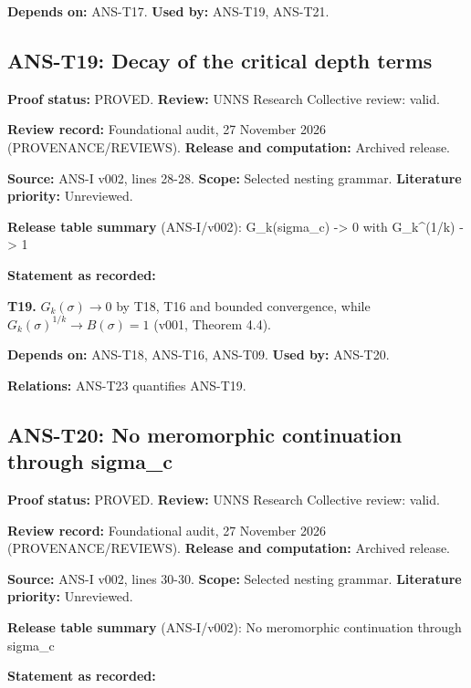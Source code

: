 \documentclass[
  11pt,
]{article}
\begin{document}
\textbf{Depends on:} ANS-T17. \textbf{Used by:} ANS-T19, ANS-T21.

\hypertarget{ans-t19-decay-of-the-critical-depth-terms}{%
\subsection{ANS-T19: Decay of the critical depth
terms}\label{ans-t19-decay-of-the-critical-depth-terms}}

\textbf{Proof status:} PROVED. \textbf{Review:} UNNS Research Collective
review: valid.

\textbf{Review record:} Foundational audit, 27 November 2026
(PROVENANCE/REVIEWS). \textbf{Release and computation:} Archived
release.

\textbf{Source:} ANS-I v002, lines 28-28. \textbf{Scope:} Selected
nesting grammar. \textbf{Literature priority:} Unreviewed.

\textbf{Release table summary} (ANS-I/v002): G\_k(sigma\_c)
-\textgreater{} 0 with G\_k\^{}(1/k) -\textgreater{} 1

\textbf{Statement as recorded:}

\textbf{T19.} \(G_k(\sigma)\to0\) by T18, T16 and bounded convergence,
while \(G_k(\sigma)^{1/k}\to B(\sigma)=1\) (v001, Theorem 4.4).

\textbf{Depends on:} ANS-T18, ANS-T16, ANS-T09. \textbf{Used by:}
ANS-T20.

\textbf{Relations:} ANS-T23 quantifies ANS-T19.

\hypertarget{ans-t20-no-meromorphic-continuation-through-sigma_c}{%
\subsection{ANS-T20: No meromorphic continuation through
sigma\_c}\label{ans-t20-no-meromorphic-continuation-through-sigma_c}}

\textbf{Proof status:} PROVED. \textbf{Review:} UNNS Research Collective
review: valid.

\textbf{Review record:} Foundational audit, 27 November 2026
(PROVENANCE/REVIEWS). \textbf{Release and computation:} Archived
release.

\textbf{Source:} ANS-I v002, lines 30-30. \textbf{Scope:} Selected
nesting grammar. \textbf{Literature priority:} Unreviewed.

\textbf{Release table summary} (ANS-I/v002): No meromorphic continuation
through sigma\_c

\textbf{Statement as recorded:}
\end{document}
